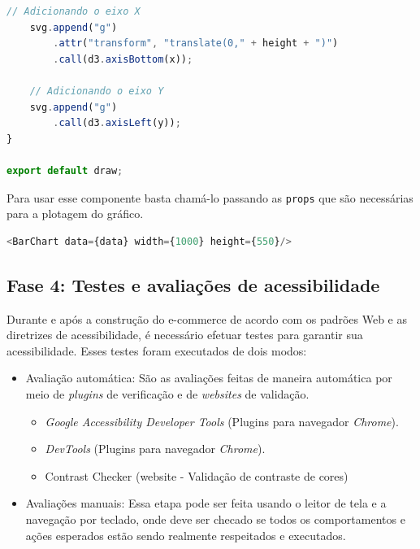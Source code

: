 {{{{\begin{lstlisting}[language=javascript,caption=exemplo de um componente de gráfico]
    // Adicionando o eixo X
    svg.append("g")
        .attr("transform", "translate(0," + height + ")")
        .call(d3.axisBottom(x));

    // Adicionando o eixo Y
    svg.append("g")
        .call(d3.axisLeft(y));
}

export default draw;
\end{lstlisting}}

}

}

Para usar esse componente basta chamá-lo passando as \lstinline{props} que são necessárias para a plotagem do gráfico.
\begin{lstlisting}[language=javascript, caption=Usando um componente reutilizável]
<BarChart data={data} width={1000} height={550}/>
\end{lstlisting}

}
\subsection{Fase 4: Testes e avaliações de acessibilidade}
{Durante e após a construção do e-commerce de acordo com os
padrões Web e as diretrizes de acessibilidade, é necessário efetuar testes para garantir sua acessibilidade. Esses testes foram executados de dois modos: 
\begin{itemize}
\item Avaliação automática: São as avaliações feitas de maneira automática por meio de \textit{plugins} de verificação e de \textit{websites} de validação.
\begin{itemize}
\item \textit{Google Accessibility Developer Tools} ({Plugins} para navegador \textit{Chrome}).
\item \textit{DevTools }({Plugins} para navegador \textit{Chrome}).
\item Contrast Checker (website - Validação de contraste de cores)
\end{itemize}
\item Avaliações manuais: Essa etapa pode ser feita usando o leitor de tela e a navegação por teclado, onde deve ser checado se todos os comportamentos e ações esperados estão sendo realmente respeitados e executados. 
\end{itemize}
}

